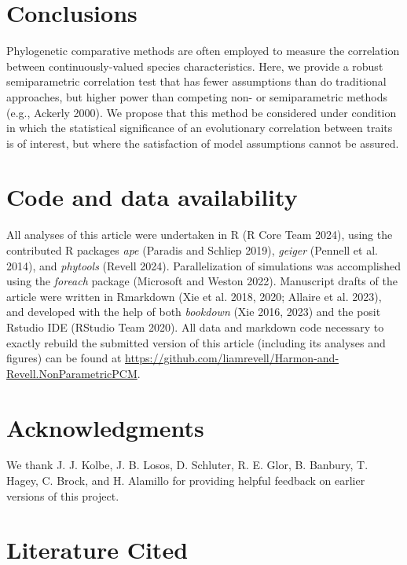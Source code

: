 \documentclass[fleqn,10pt,lineno]{wlpeerj} %
\begin{document}
\section{Conclusions}\label{conclusions}

Phylogenetic comparative methods are often employed to measure the correlation between continuously-valued species characteristics. Here, we provide a robust semiparametric correlation test that has fewer assumptions than do traditional approaches, but higher power than competing non- or semiparametric methods (e.g., Ackerly 2000). We propose that this method be considered under condition in which the statistical significance of an evolutionary correlation between traits is of interest, but where the satisfaction of model assumptions cannot be assured.

\section{Code and data availability}\label{code-and-data-availability}

All analyses of this article were undertaken in R (R Core Team 2024), using the contributed R packages \emph{ape} (Paradis and Schliep 2019), \emph{geiger} (Pennell et al. 2014), and \emph{phytools} (Revell 2024). Parallelization of simulations was accomplished using the \emph{foreach} package (Microsoft and Weston 2022). Manuscript drafts of the article were written in Rmarkdown (Xie et al. 2018, 2020; Allaire et al. 2023), and developed with the help of both \emph{bookdown} (Xie 2016, 2023) and the posit Rstudio IDE (RStudio Team 2020). All data and markdown code necessary to exactly rebuild the submitted version of this article (including its analyses and figures) can be found at \href{https://github.com/liamrevell/Revell-and-Harmon.NonParametricPCM}{https://github.com/liamrevell/Harmon-and-Revell.NonParametricPCM}.

\section{Acknowledgments}\label{acknowledgments}

We thank J. J. Kolbe, J. B. Losos, D. Schluter, R. E. Glor, B. Banbury, T. Hagey, C. Brock, and H. Alamillo for providing helpful feedback on earlier versions of this project.

\section*{Literature Cited}\label{literature-cited}
\end{document}
